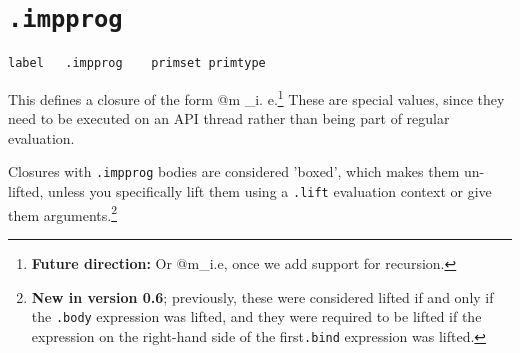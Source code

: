 \documentclass{report}
\newcommand\stringcode[1]{\texttt{#1}}
\newcommand\new[2]{\footnote{\textbf{New in version #1}; previously, #2}}
\newcommand\future[1]{\footnote{\textbf{Future direction:} #1}}
\begin{document}
\section{\stringcode{.impprog}}

\begin{verbatim}
label	.impprog	primset	primtype
\end{verbatim}

This defines a closure of the form \< @m _i. e\>.\future{Or \<\;\;@m\;\overline{g_i}_i.\;e\>, once we add support for recursion.}
These are special values, since they need to be executed on an API thread rather than being part of regular evaluation.

Closures with \stringcode{.impprog} bodies are considered 'boxed', which makes them un-lifted,
unless you specifically lift them using a \stringcode{.lift} evaluation context or give them arguments.\new{0.6}{
  these were considered lifted if and only if the \stringcode{.body} expression was lifted,
  and they were required to be lifted if the expression on the right-hand side of the first\stringcode{.bind} expression was lifted.
}
\end{document}
